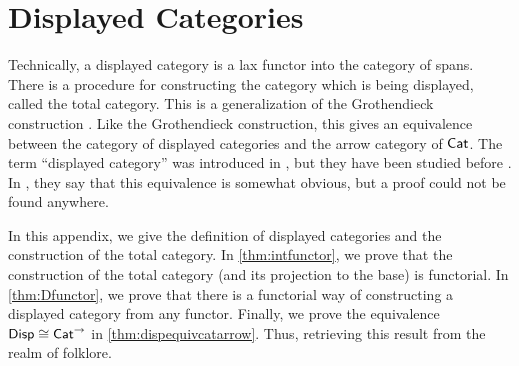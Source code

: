 \section{Displayed Categories}\label{display}

Technically, a displayed category is a lax functor into the category of spans. There is a procedure for constructing the category which is being displayed, called the total category. This is a generalization of the Grothendieck construction \cite{SGAI}. Like the Grothendieck construction, this gives an equivalence between the category of displayed categories and the arrow category of $\mathsf{Cat}$. The term ``displayed category'' was introduced in \cite{displayed}, but they have been studied before \cite{Abramsky, benabounotes}. In \cite{Abramsky}, they say that this equivalence is somewhat obvious, but a proof could not be found anywhere. 

In this appendix, we give the definition of displayed categories and the construction of the total category. In \cref{thm:intfunctor}, we prove that the construction of the total category (and its projection to the base) is functorial. In \cref{thm:Dfunctor}, we prove that there is a functorial way of constructing a displayed category from any functor. Finally, we prove the equivalence $\mathsf{Disp} \cong \mathsf{Cat}^\to$ in \cref{thm:dispequivcatarrow}. Thus, retrieving this result from the realm of folklore.



